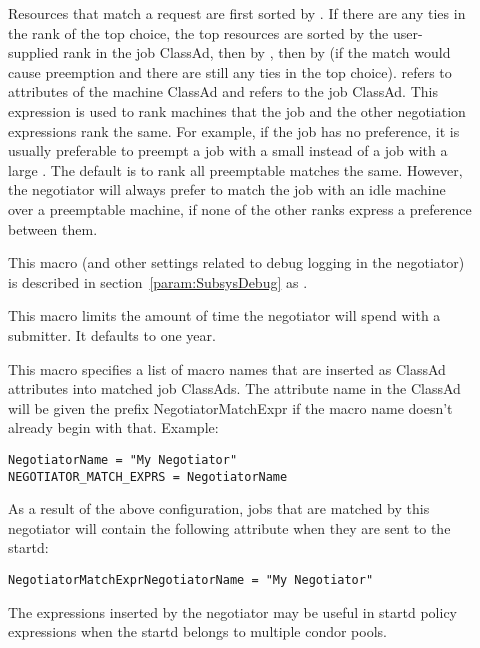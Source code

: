 \begin{description}
\item[] \label{param:PreemptionRank} Resources
  that match a request are first sorted by
  .  If there are any ties in the
  rank of the top choice, the top resources are sorted by the
  user-supplied rank in the job ClassAd, then by
  , then by
   (if the match would cause preemption and
  there are still any ties in the top choice).  \verb@MY@ refers to
  attributes of the machine ClassAd and \verb@TARGET@ refers to the
  job ClassAd.  This expression is used to rank machines that the job
  and the other negotiation expressions rank the same.  For example,
  if the job has no preference, it is usually preferable to preempt a
  job with a small  instead of a job with a large
  .  The default is to rank all preemptable matches
  the same.  However, the negotiator will always prefer to match the
  job with an idle machine over a preemptable machine, if none of the
  other ranks express a preference between them.

\item[] \label{param:NegotiatorDebug} This macro
  (and other settings related to debug logging in the negotiator) is
  described in section~\ref{param:SubsysDebug} as .

\item[] \label{param:NegotiatorMaxTimePerSubmitter} This macro limits the amount of time the negotiator will 
spend with a submitter. It defaults to one year.

\item[]
\label{param:NegotiatorMatchExprs} This macro specifies a list of macro names
that are inserted as ClassAd attributes into matched job ClassAds.
The attribute name in the ClassAd will be given the prefix
NegotiatorMatchExpr if the macro name doesn't already begin with that.
Example:

\begin{verbatim}
NegotiatorName = "My Negotiator"
NEGOTIATOR_MATCH_EXPRS = NegotiatorName
\end{verbatim}

As a result of the above configuration, jobs that are matched by this
negotiator will contain the following attribute when they are sent to
the startd:

\begin{verbatim}
NegotiatorMatchExprNegotiatorName = "My Negotiator"
\end{verbatim}

The expressions inserted by the negotiator may be useful in startd
policy expressions when the startd belongs to multiple condor pools.

\end{description}
